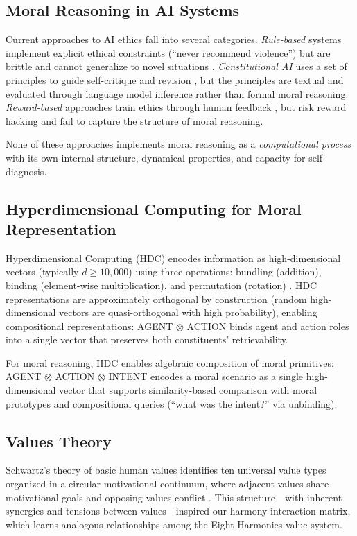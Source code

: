 \documentclass[11pt,a4paper]{article}
\begin{document}
\subsection{Moral Reasoning in AI Systems}

Current approaches to AI ethics fall into several categories. \emph{Rule-based} systems implement explicit ethical constraints (``never recommend violence'') but are brittle and cannot generalize to novel situations \citep{anderson2011}. \emph{Constitutional AI} uses a set of principles to guide self-critique and revision \citep{bai2022}, but the principles are textual and evaluated through language model inference rather than formal moral reasoning. \emph{Reward-based} approaches train ethics through human feedback \citep{christiano2017}, but risk reward hacking and fail to capture the structure of moral reasoning.

None of these approaches implements moral reasoning as a \emph{computational process} with its own internal structure, dynamical properties, and capacity for self-diagnosis.

\subsection{Hyperdimensional Computing for Moral Representation}

Hyperdimensional Computing (HDC) encodes information as high-dimensional vectors (typically $d \geq 10{,}000$) using three operations: bundling (addition), binding (element-wise multiplication), and permutation (rotation) \citep{kanerva2009}. HDC representations are approximately orthogonal by construction (random high-dimensional vectors are quasi-orthogonal with high probability), enabling compositional representations: AGENT $\otimes$ ACTION binds agent and action roles into a single vector that preserves both constituents' retrievability.

For moral reasoning, HDC enables algebraic composition of moral primitives: AGENT $\otimes$ ACTION $\otimes$ INTENT encodes a moral scenario as a single high-dimensional vector that supports similarity-based comparison with moral prototypes and compositional queries (``what was the intent?'' via unbinding).

\subsection{Values Theory}

Schwartz's theory of basic human values identifies ten universal value types organized in a circular motivational continuum, where adjacent values share motivational goals and opposing values conflict \citep{schwartz1992}. This structure---with inherent synergies and tensions between values---inspired our harmony interaction matrix, which learns analogous relationships among the Eight Harmonies value system.
\end{document}
